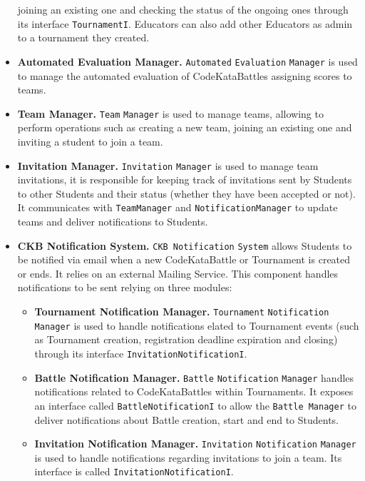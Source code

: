 \begin{itemize}
    joining an existing one and checking the status of the ongoing ones through its interface \verb|TournamentI|. Educators can also add other Educators as admin to a tournament they created.
    \item \textbf{Automated Evaluation Manager.} \verb|Automated| \verb|Evaluation| \verb|Manager| is used to manage the automated evaluation of CodeKataBattles assigning scores to teams.
    \item \textbf{Team Manager.} \verb|Team| \verb|Manager| is used to manage teams, allowing to perform operations such as creating a new team, joining an existing one and inviting a student to join a team.
    \item \textbf{Invitation Manager.} \verb|Invitation| \verb|Manager| is used to manage team invitations, it is responsible for keeping track of invitations sent by Students to other Students and their status (whether they have been accepted or not).
    It communicates with \verb|TeamManager| and \verb|NotificationManager| to update teams and deliver notifications to Students.
    \item \textbf{CKB Notification System.} \verb|CKB Notification| \verb|System| allows Students to be notified via email when a new CodeKataBattle or Tournament is created or ends. It relies on an external Mailing Service. 
    This component handles notifications to be sent relying on three modules:
        \begin{itemize}
            \item \textbf{Tournament Notification Manager.} \verb|Tournament| \verb|Notification| \verb|Manager| is used to handle notifications elated to Tournament events (such as Tournament creation, registration deadline expiration and closing) 
            through its interface \verb|InvitationNotificationI|.
            \item \textbf{Battle Notification Manager.} \verb|Battle| \verb|Notification| \verb|Manager| handles notifications related to CodeKataBattles within Tournaments. It exposes an interface called \verb|BattleNotificationI| to allow the \verb|Battle Manager| 
            to deliver notifications about Battle creation, start and end to Students. 
            \item \textbf{Invitation Notification Manager.} \verb|Invitation| \verb|Notification| \verb|Manager| is used to handle notifications regarding invitations to join a team. Its interface is called \verb|InvitationNotificationI|.
        \end{itemize}
\end{itemize}
